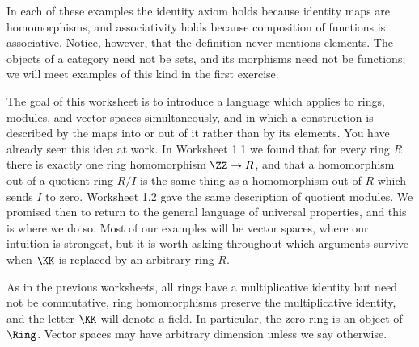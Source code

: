 \documentclass[12pt,reqno]{amsart}
\begin{document}
In each of these examples the identity axiom holds because identity maps are homomorphisms, and associativity holds because composition of functions is associative. Notice, however, that the definition never mentions elements. The objects of a category need not be sets, and its morphisms need not be functions; we will meet examples of this kind in the first exercise.

The goal of this worksheet is to introduce a language which applies to rings, modules, and vector spaces simultaneously, and in which a construction is described by the maps into or out of it rather than by its elements. You have already seen this idea at work. In Worksheet 1.1 we found that for every ring $R$ there is exactly one ring homomorphism $\ZZ\to R$, and that a homomorphism out of a quotient ring $R/I$ is the same thing as a homomorphism out of $R$ which sends $I$ to zero. Worksheet 1.2 gave the same description of quotient modules. We promised then to return to the general language of universal properties, and this is where we do so. Most of our examples will be vector spaces, where our intuition is strongest, but it is worth asking throughout which arguments survive when $\KK$ is replaced by an arbitrary ring $R$.

As in the previous worksheets, all rings have a multiplicative identity but need not be commutative, ring homomorphisms preserve the multiplicative identity, and the letter $\KK$ will denote a field. In particular, the zero ring is an object of $\Ring$. Vector spaces may have arbitrary dimension unless we say otherwise.


\hrulefill
\end{document}

